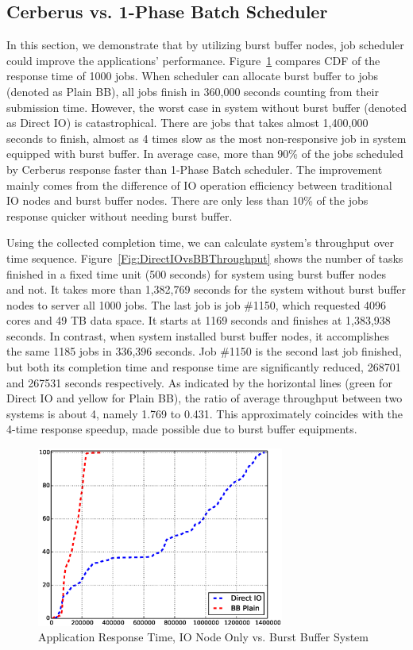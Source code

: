 \subsection{Cerberus vs. 1-Phase Batch Scheduler}
\label{Sec:Sim:DirectIOvsBB}
In this section, we demonstrate that by utilizing burst buffer nodes,
job scheduler could improve the applications' performance.
Figure~\ref{Fig:DirectIOvsBBResponse} compares CDF of the response time of 1000 jobs.
When scheduler can allocate burst buffer to jobs (denoted as Plain BB),
all jobs finish in 360,000 seconds counting from their submission time.
However, the worst case in system without burst buffer (denoted as Direct IO) is catastrophical.
There are jobs that takes almost 1,400,000 seconds to finish,
almost as 4 times slow as the most non-responsive job in system equipped with burst buffer.
In average case, more than 90\% of the jobs scheduled by Cerberus response faster than 1-Phase Batch scheduler.
The improvement mainly comes from the difference of IO operation efficiency between
traditional IO nodes and burst buffer nodes.
There are only less than 10\% of the jobs response quicker without needing burst buffer.

Using the collected completion time, we can calculate system's throughput over time sequence.
Figure~\ref{Fig:DirectIOvsBBThroughput} shows the number of tasks finished
in a fixed time unit (500 seconds) for system using burst buffer nodes and not.
It takes more than 1,382,769 seconds for the system without burst buffer nodes to
server all 1000 jobs.
The last job is job \#1150, which requested 4096 cores and 49 TB data space.
It starts at 1169 seconds and finishes at 1,383,938 seconds.
In contrast, when system installed burst buffer nodes,
it accomplishes the same 1185 jobs in 336,396 seconds.
Job \#1150 is the second last job finished, but both its completion time and response time
are significantly reduced, 268701 and 267531 seconds respectively.
As indicated by the horizontal lines (green for Direct IO and yellow for Plain BB),
the ratio of average throughput between two systems is about 4, namely 1.769 to 0.431.
This approximately coincides with the 4-time response speedup,
made possible due to burst buffer equipments.


\begin{figure}[!t]
        \centering
        \includegraphics[width=3.2in]{DrawDirectIOvsBB/1000jobs_direct_vs_bb_response}
        \caption{Application Response Time, IO Node Only vs. Burst Buffer System}
        \label{Fig:DirectIOvsBBResponse}
\end{figure}

